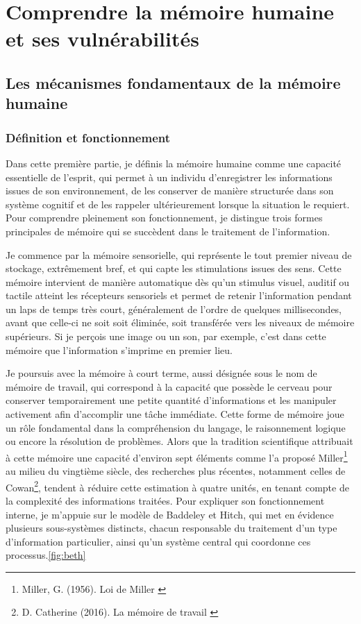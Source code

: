\documentclass[11pt,a4paper]{report}
\begin{document}
\chapter{Comprendre la mémoire humaine et ses vulnérabilités}
\section{Les mécanismes fondamentaux de la mémoire humaine}
\subsection{Définition et fonctionnement}
Dans cette première partie, je définis la mémoire humaine comme une capacité essentielle de l’esprit, qui permet à un individu d’enregistrer les informations issues de son environnement, de les conserver de manière structurée dans son système cognitif et de les rappeler ultérieurement lorsque la situation le requiert. Pour comprendre pleinement son fonctionnement, je distingue trois formes principales de mémoire qui se succèdent dans le traitement de l’information.

Je commence par la mémoire sensorielle, qui représente le tout premier niveau de stockage, extrêmement bref, et qui capte les stimulations issues des sens. Cette mémoire intervient de manière automatique dès qu’un stimulus visuel, auditif ou tactile atteint les récepteurs sensoriels et permet de retenir l’information pendant un laps de temps très court, généralement de l’ordre de quelques millisecondes, avant que celle-ci ne soit soit éliminée, soit transférée vers les niveaux de mémoire supérieurs. Si je perçois une image ou un son, par exemple, c’est dans cette mémoire que l’information s’imprime en premier lieu.

Je poursuis avec la mémoire à court terme, aussi désignée sous le nom de mémoire de travail, qui correspond à la capacité que possède le cerveau pour conserver temporairement une petite quantité d’informations et les manipuler activement afin d’accomplir une tâche immédiate. Cette forme de mémoire joue un rôle fondamental dans la compréhension du langage, le raisonnement logique ou encore la résolution de problèmes. Alors que la tradition scientifique attribuait à cette mémoire une capacité d’environ sept éléments comme l’a proposé Miller\footnote{Miller, G. (1956). Loi de Miller \cite{miller}} au milieu du vingtième siècle, des recherches plus récentes, notamment celles de Cowan\footnote{D. Catherine (2016). La mémoire de travail \cite{demoulin}}, tendent à réduire cette estimation à quatre unités, en tenant compte de la complexité des informations traitées. Pour expliquer son fonctionnement interne, je m’appuie sur le modèle de Baddeley et Hitch, qui met en évidence plusieurs sous-systèmes distincts, chacun responsable du traitement d’un type d’information particulier, ainsi qu’un système central qui coordonne ces processus.\ref{fig:beth}
\end{document}
